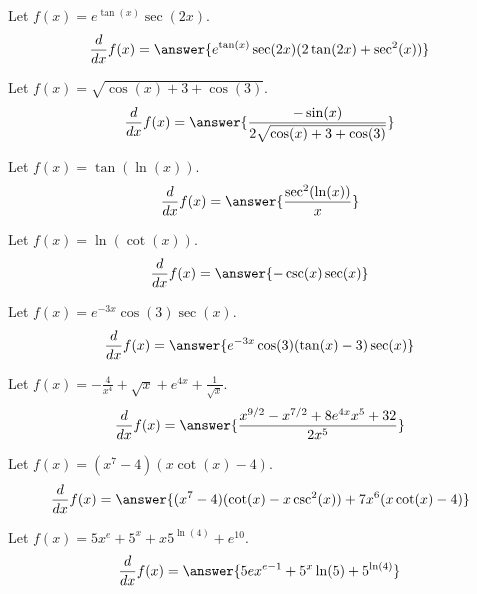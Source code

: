 \documentclass{ximera}
\begin{document}
\begin{shuffle}
\begin{exercise}
Let $f(x)=e^{\tan (x)} \sec (2 x)$.
\[
\ddx f(x) = \answer{e^{\tan (x)} \sec (2 x) (2 \tan (2 x)+\sec ^2(x))}
\]
\end{exercise}

\begin{exercise}
Let $f(x)=\sqrt{\cos (x)+3+\cos (3)}$.
\[
\ddx f(x) = \answer{\frac{-\sin (x)}{2 \sqrt{\cos (x)+3+\cos (3)}}}
\]
\end{exercise}

\begin{exercise}
Let $f(x)=\tan (\ln (x))$.
\[
\ddx f(x) = \answer{\frac{\sec ^2(\ln (x))}{x}}
\]
\end{exercise}

\begin{exercise}
Let $f(x)=\ln (\cot (x))$.
\[
\ddx f(x) = \answer{-\csc (x) \sec (x)}
\]
\end{exercise}

\begin{exercise}
Let $f(x)=e^{-3 x} \cos (3) \sec (x)$.
\[
\ddx f(x) = \answer{e^{-3 x} \cos (3) (\tan (x)-3) \sec (x)}
\]
\end{exercise}

\begin{exercise}
Let $f(x)=-\frac{4}{x^4}+\sqrt{x}+e^{4 x}+\frac{1}{\sqrt{x}}$.
\[
\ddx f(x) = \answer{\frac{x^{9/2}-x^{7/2}+8 e^{4 x} x^5+32}{2 x^5}}
\]
\end{exercise}

\begin{exercise}
Let $f(x)=(x^7-4) (x \cot (x)-4)$.
\[
\ddx f(x) = \answer{(x^7-4) (\cot (x)-x \csc ^2(x))+7 x^6 (x \cot (x)-4)}
\]
\end{exercise}

\begin{exercise}
Let $f(x)=5 x^e+5^x+x 5^{\ln (4)}+e^{10}$.
\[
\ddx f(x) = \answer{5 e x^{e-1}+5^x \ln (5)+5^{\ln (4)}}
\]
\end{exercise}




\end{shuffle}
\end{document}
